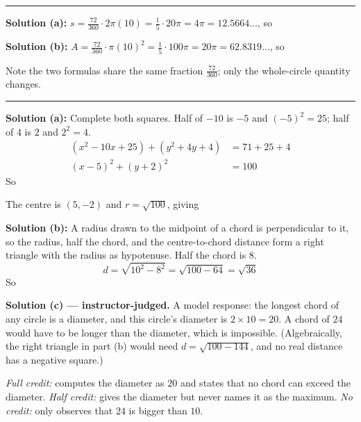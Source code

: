 \documentclass[12pt]{article}
\begin{document}
\vspace{0.2cm}\noindent\rule{\linewidth}{0.2pt}


\textbf{Solution (a):} $s = \frac{72}{360}\cdot 2\pi(10) = \frac{1}{5}\cdot 20\pi = 4\pi = 12.5664\ldots$, so 

\textbf{Solution (b):} $A = \frac{72}{360}\cdot \pi (10)^2 = \frac{1}{5}\cdot 100\pi = 20\pi = 62.8319\ldots$, so 

Note the two formulas share the same fraction $\frac{72}{360}$; only the whole-circle quantity changes.

\vspace{0.2cm}\noindent\rule{\linewidth}{0.2pt}


\textbf{Solution (a):} Complete both squares. Half of $-10$ is $-5$ and $(-5)^2 = 25$; half of $4$ is $2$ and $2^2 = 4$.
\begin{align*}
  (x^2 - 10x + 25) + (y^2 + 4y + 4) &= 71 + 25 + 4 \\
  (x - 5)^2 + (y + 2)^2 &= 100
\end{align*}
So 

The centre is $(5, -2)$ and $r = \sqrt{100}$, giving 

\textbf{Solution (b):} A radius drawn to the midpoint of a chord is perpendicular to it, so the radius, half the chord, and the centre-to-chord distance form a right triangle with the radius as hypotenuse. Half the chord is $8$.
\[ d = \sqrt{10^2 - 8^2} = \sqrt{100 - 64} = \sqrt{36} \]
So 

\textbf{Solution (c) --- instructor-judged.} A model response: the longest chord of any circle is a diameter, and this circle's diameter is $2 \times 10 = 20$. A chord of $24$ would have to be longer than the diameter, which is impossible. (Algebraically, the right triangle in part (b) would need $d = \sqrt{100 - 144}$, and no real distance has a negative square.)

\emph{Full credit:} computes the diameter as $20$ and states that no chord can exceed the diameter. \emph{Half credit:} gives the diameter but never names it as the maximum. \emph{No credit:} only observes that $24$ is bigger than $10$.
\end{document}
